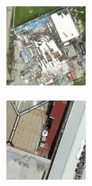 \begin{figure} [H]
\begin{subfigure}{.275\textwidth}
	\end{subfigure}
	\begin{subfigure}{.275\textwidth}
		\centering
		\includegraphics[width=.95\linewidth]{figs/5.jpg}
	\end{subfigure}
	\begin{subfigure}{.275\textwidth}
		\centering
		\includegraphics[width=.95\linewidth]{figs/6.jpg}

\end{subfigure}
\end{figure}
